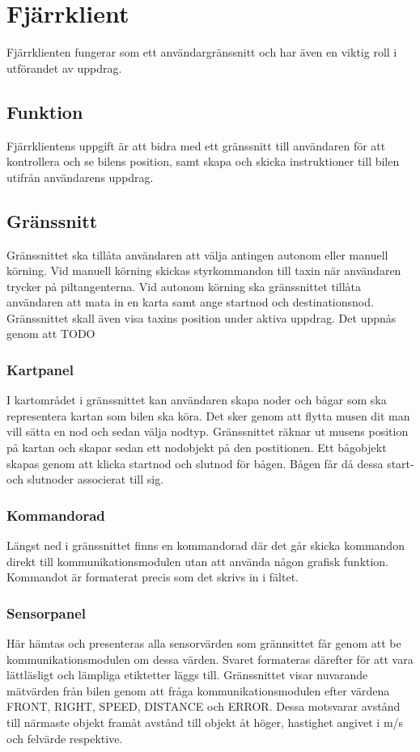 \documentclass[tekniskrapport/tech.tex]{subfiles}
\begin{document}
\section{Fjärrklient}
Fjärrklienten fungerar som ett användargränssnitt och har även en
viktig roll i utförandet av uppdrag.

\subsection{Funktion}
Fjärrklientens uppgift är att bidra med ett gränssnitt till användaren för att
kontrollera och se bilens position, samt skapa och skicka instruktioner till
bilen utifrån användarens uppdrag.

\subsection{Gränssnitt} Gränssnittet ska tillåta användaren att välja antingen
autonom eller manuell körning. Vid manuell körning skickas styrkommandon till
taxin när användaren trycker på piltangenterna. Vid autonom körning ska
gränssnittet tillåta användaren att mata in en karta samt ange startnod och
destinationsnod. Gränssnittet skall även visa taxins position under aktiva
uppdrag. Det uppnås genom att TODO

\subsubsection{Kartpanel}
I kartområdet i gränssnittet kan användaren skapa noder och bågar som ska
representera kartan som bilen ska köra. Det sker genom att flytta musen dit
man vill sätta en nod och sedan välja nodtyp. Gränssnittet räknar
ut musens position på kartan och skapar sedan ett nodobjekt på den postitionen.
Ett bågobjekt skapas genom att klicka startnod och slutnod för bågen.
Bågen får då dessa start- och slutnoder associerat till sig.

\subsubsection{Kommandorad}
Längst ned i gränssnittet finns en kommandorad där det går skicka kommandon
direkt till kommunikationsmodulen utan att använda någon grafisk funktion.
Kommandot är formaterat precis som det skrivs in i fältet.

\subsubsection{Sensorpanel}
Här hämtas och presenteras alla sensorvärden som grännsittet får genom att be
kommunikationsmodulen om dessa värden. Svaret formateras därefter för att vara
lättläsligt och lämpliga etiktetter läggs till. Gränssnittet visar nuvarande
mätvärden från bilen genom att fråga kommunikationsmodulen efter värdena FRONT,
RIGHT, SPEED, DISTANCE och ERROR. Dessa motsvarar avstånd till närmaste objekt
framåt avstånd till objekt åt höger, hastighet angivet i m/s och felvärde
respektive. 
\end{document}
